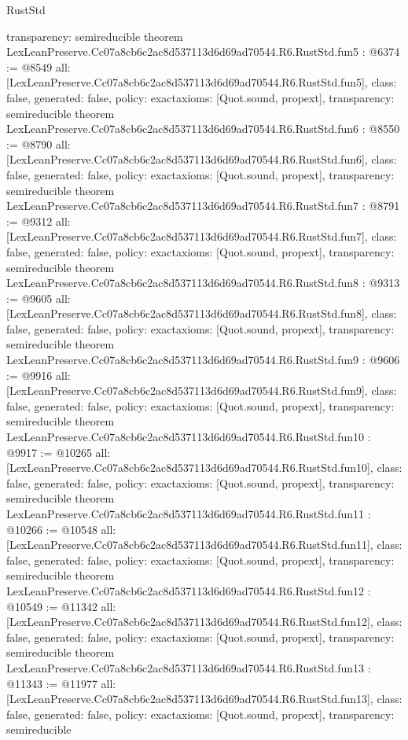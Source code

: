 \begin{lexlean}{RustStd}
\begin{coremodule}
{  transparency: semireducible
}
theorem LexLeanPreserve.Cc07a8cb6c2ac8d537113d6d69ad70544.R6.RustStd.fun5 : @6374 := @8549 {
  all: [LexLeanPreserve.Cc07a8cb6c2ac8d537113d6d69ad70544.R6.RustStd.fun5],
  class: false,
  generated: false,
  policy: exact{axioms: [Quot.sound, propext]},
  transparency: semireducible
}
theorem LexLeanPreserve.Cc07a8cb6c2ac8d537113d6d69ad70544.R6.RustStd.fun6 : @8550 := @8790 {
  all: [LexLeanPreserve.Cc07a8cb6c2ac8d537113d6d69ad70544.R6.RustStd.fun6],
  class: false,
  generated: false,
  policy: exact{axioms: [Quot.sound, propext]},
  transparency: semireducible
}
theorem LexLeanPreserve.Cc07a8cb6c2ac8d537113d6d69ad70544.R6.RustStd.fun7 : @8791 := @9312 {
  all: [LexLeanPreserve.Cc07a8cb6c2ac8d537113d6d69ad70544.R6.RustStd.fun7],
  class: false,
  generated: false,
  policy: exact{axioms: [Quot.sound, propext]},
  transparency: semireducible
}
theorem LexLeanPreserve.Cc07a8cb6c2ac8d537113d6d69ad70544.R6.RustStd.fun8 : @9313 := @9605 {
  all: [LexLeanPreserve.Cc07a8cb6c2ac8d537113d6d69ad70544.R6.RustStd.fun8],
  class: false,
  generated: false,
  policy: exact{axioms: [Quot.sound, propext]},
  transparency: semireducible
}
theorem LexLeanPreserve.Cc07a8cb6c2ac8d537113d6d69ad70544.R6.RustStd.fun9 : @9606 := @9916 {
  all: [LexLeanPreserve.Cc07a8cb6c2ac8d537113d6d69ad70544.R6.RustStd.fun9],
  class: false,
  generated: false,
  policy: exact{axioms: [Quot.sound, propext]},
  transparency: semireducible
}
theorem LexLeanPreserve.Cc07a8cb6c2ac8d537113d6d69ad70544.R6.RustStd.fun10 : @9917 := @10265 {
  all: [LexLeanPreserve.Cc07a8cb6c2ac8d537113d6d69ad70544.R6.RustStd.fun10],
  class: false,
  generated: false,
  policy: exact{axioms: [Quot.sound, propext]},
  transparency: semireducible
}
theorem LexLeanPreserve.Cc07a8cb6c2ac8d537113d6d69ad70544.R6.RustStd.fun11 : @10266 := @10548 {
  all: [LexLeanPreserve.Cc07a8cb6c2ac8d537113d6d69ad70544.R6.RustStd.fun11],
  class: false,
  generated: false,
  policy: exact{axioms: [Quot.sound, propext]},
  transparency: semireducible
}
theorem LexLeanPreserve.Cc07a8cb6c2ac8d537113d6d69ad70544.R6.RustStd.fun12 : @10549 := @11342 {
  all: [LexLeanPreserve.Cc07a8cb6c2ac8d537113d6d69ad70544.R6.RustStd.fun12],
  class: false,
  generated: false,
  policy: exact{axioms: [Quot.sound, propext]},
  transparency: semireducible
}
theorem LexLeanPreserve.Cc07a8cb6c2ac8d537113d6d69ad70544.R6.RustStd.fun13 : @11343 := @11977 {
  all: [LexLeanPreserve.Cc07a8cb6c2ac8d537113d6d69ad70544.R6.RustStd.fun13],
  class: false,
  generated: false,
  policy: exact{axioms: [Quot.sound, propext]},
  transparency: semireducible
}
\end{coremodule}
\end{lexlean}
